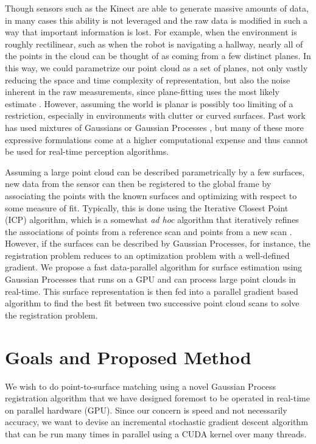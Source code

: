 \documentclass{article} %
\begin{document}
Though sensors such as the Kinect are able to generate massive amounts of data, in many cases this ability is not leveraged and the raw data is modified in such a way that important information is lost. For example, when the environment is roughly rectilinear, such as when the robot is navigating a hallway, nearly all of the points in the cloud can be thought of as coming from a few distinct planes. In this way, we could parametrize our point cloud as a set of planes, not only vastly reducing the space and time complexity of representation, but also the noise inherent in the raw measurements, since plane-fitting uses the most likely estimate \cite{martin_real-time_2002}\cite{liu_using_2001}\cite{thrun_real-time_2004}. However, assuming the world is planar is possibly too limiting of a restriction, especially in environments with clutter or curved surfaces. Past work has used mixtures of Gaussians \cite{tsin2004correlation} \cite{jian2005robust} or Gaussian Processes \cite{plagemann2008nonstationary}, but many of these more expressive formulations come at a higher computational expense and thus cannot be used for real-time perception algorithms.

Assuming a large point cloud can be described parametrically by a few surfaces, new data from the sensor can then be registered to the global frame by associating the points with the known surfaces and optimizing with respect to some measure of fit. Typically, this is done using the Iterative Closest Point (ICP) algorithm, which is a somewhat \emph{ad hoc} algorithm that iteratively refines the associations of points from a reference scan and points from a new scan \cite{besl_method_1992}. However, if the surfaces can be described by Gaussian Processes, for instance, the registration problem reduces to an optimization problem with a well-defined gradient. We propose a fast data-parallel algorithm for surface estimation using Gaussian Processes that runs on a GPU and can process large point clouds in real-time. This surface representation is then fed into a parallel gradient based algorithm to find the best fit between two successive point cloud scans to solve the registration problem.

\section{Goals and Proposed Method}

We wish to do point-to-surface matching using a novel Gaussian Process registration algorithm that we have designed foremost to be operated in real-time on parallel hardware (GPU). Since our concern is speed and not necessarily accuracy, we want to devise an incremental stochastic gradient descent algorithm that can be run many times in parallel using a CUDA kernel over many threads. 
\end{document}
